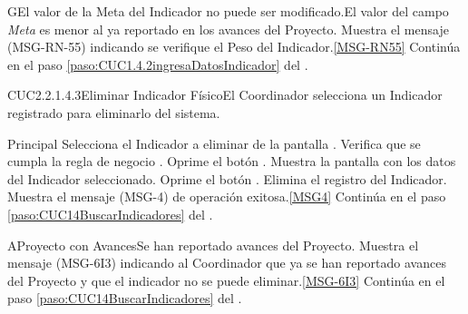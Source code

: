 	\begin{UCtrayectoriaA}{G}{El valor de la Meta del Indicador no puede ser modificado.}{El valor del campo \textit{Meta} es menor al ya reportado en los avances del Proyecto.}
			\UCpaso Muestra el mensaje (MSG-RN-55) indicando se verifique el Peso del Indicador.\ref{MSG-RN55}
			\UCpaso Continúa en el paso \ref{paso:CUC1.4.2ingresaDatosIndicador} del .
	\end{UCtrayectoriaA}
	\begin{UseCase}{CUC2.2.1.4.3}{Eliminar Indicador Físico}{El Coordinador selecciona un Indicador registrado para eliminarlo del sistema.}
	\end{UseCase}

	\begin{UCtrayectoria}{Principal}
			\UCpaso [\UCactor] Selecciona el Indicador a eliminar de la pantalla .
			\UCpaso Verifica que se cumpla la regla de negocio .
			\UCpaso[\UCactor] Oprime el botón .
			\UCpaso Muestra la pantalla  con los datos del Indicador seleccionado.
			\UCpaso [\UCactor] Oprime el botón . 
			\UCpaso Elimina el registro del Indicador.
			\UCpaso Muestra el mensaje (MSG-4) de operación exitosa.\ref{MSG4}
			\UCpaso Continúa en el paso \ref{paso:CUC14BuscarIndicadores} del .
	\end{UCtrayectoria}
		\begin{UCtrayectoriaA}{A}{Proyecto con Avances}{Se han reportado avances del Proyecto.}
			\UCpaso Muestra el mensaje (MSG-6I3) indicando al Coordinador que ya se han reportado avances del Proyecto y que el indicador no se puede eliminar.\ref{MSG-6I3}
			\UCpaso Continúa en el paso \ref{paso:CUC14BuscarIndicadores} del .
		\end{UCtrayectoriaA}


